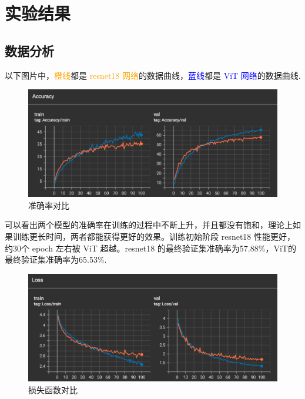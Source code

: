 \documentclass[notitlepage,cs4size,punct,oneside]{ctexrep}
\numberwithin{equation}{chapter}
\theoremstyle{mystyle}
\begin{document}





\section{实验结果}
\subsection{数据分析}
以下图片中，\textcolor{orange}{橙线}都是 \textcolor{orange}{resnet18 网络}的数据曲线，\textcolor{blue}{蓝线}都是 \textcolor{blue}{ViT 网络}的数据曲线.

\begin{figure}[H]
    \centering
    \includegraphics[scale=0.75]{transformer_acc.png}
    \caption{准确率对比}
\end{figure}
可以看出两个模型的准确率在训练的过程中不断上升，并且都没有饱和，理论上如果训练更长时间，两者都能获得更好的效果。训练初始阶段 resnet18 性能更好，约30个 epoch 左右被 ViT 超越。resnet18 的最终验证集准确率为57.88\%，ViT的最终验证集准确率为65.53\%.
\begin{figure}[H]
    \centering
    \includegraphics[scale=0.75]{transformer_loss.png}
    \caption{损失函数对比}
\end{figure}
\end{document}
